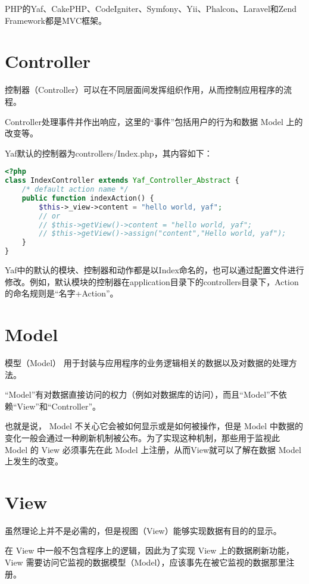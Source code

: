 PHP的Yaf、CakePHP、CodeIgniter、Symfony、Yii、Phalcon、Laravel和Zend Framework都是MVC框架。


\section{Controller}

控制器（Controller）可以在不同层面间发挥组织作用，从而控制应用程序的流程。

Controller处理事件并作出响应，这里的“事件”包括用户的行为和数据 Model 上的改变等。



Yaf默认的控制器为controllers/Index.php，其内容如下：

\begin{lstlisting}[language=PHP]
<?php
class IndexController extends Yaf_Controller_Abstract {
    /* default action name */
    public function indexAction() {
        $this->_view->content = "hello world, yaf";
        // or
        // $this->getView()->content = "hello world, yaf";
        // $this->getView()->assign("content","Hello world, yaf");
    }
}
\end{lstlisting}

Yaf中的默认的模块、控制器和动作都是以Index命名的，也可以通过配置文件进行修改。例如，默认模块的控制器在application目录下的controllers目录下，Action的命名规则是“名字+Action”。

\section{Model}

模型（Model） 用于封装与应用程序的业务逻辑相关的数据以及对数据的处理方法。

“Model”有对数据直接访问的权力（例如对数据库的访问），而且“Model”不依赖“View”和“Controller”。

也就是说， Model 不关心它会被如何显示或是如何被操作，但是 Model 中数据的变化一般会通过一种刷新机制被公布。为了实现这种机制，那些用于监视此 Model 的 View 必须事先在此 Model 上注册，从而View就可以了解在数据 Model 上发生的改变。




\section{View}

虽然理论上并不是必需的，但是视图（View）能够实现数据有目的的显示。

在 View 中一般不包含程序上的逻辑，因此为了实现 View 上的数据刷新功能，View 需要访问它监视的数据模型（Model），应该事先在被它监视的数据那里注册。




